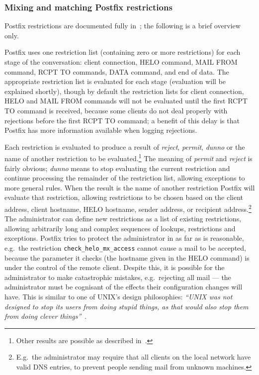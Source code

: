 \subsubsection{Mixing and matching Postfix restrictions}

\label{Mixing and matching Postfix restrictions}

Postfix restrictions are documented fully in~\cite{smtpd_access_readme,
smtpd_per_user_control, policy-servers}; the following is a brief overview
only.

Postfix uses one restriction list (containing zero or more restrictions)
for each stage of the \SMTP{} conversation: client connection, HELO
command, MAIL FROM command, RCPT TO commands, DATA command, and end of
data.  The appropriate restriction list is evaluated for each stage
(evaluation will be explained shortly), though by default the restriction
lists for client connection, HELO and MAIL FROM commands will not be
evaluated until the first RCPT TO command is received, because some clients
do not deal properly with rejections before the first RCPT TO command; a
benefit of this delay is that Postfix has more information available when
logging rejections.

Each restriction is evaluated to produce a result of \textit{reject},
\textit{permit}, \textit{dunno\/} or the name of another restriction to be
evaluated.\footnote{Other results are possible as described
in~\cite{smtpd_access_readme,smtpd_per_user_control,policy-servers}.} The
meaning of \textit{permit\/} and \textit{reject\/} is fairly obvious;
\textit{dunno\/} means to stop evaluating the current restriction and
continue processing the remainder of the restriction list, allowing
exceptions to more general rules.  When the result is the name of another
restriction Postfix will evaluate that restriction, allowing restrictions
to be chosen based on the client \IP{} address, client hostname, HELO
hostname, sender address, or recipient address.\footnote{E.g.\ the
administrator may require that all clients on the local network have valid
DNS entries, to prevent people sending mail from unknown machines.}  The
administrator can define new restrictions as a list of existing
restrictions, allowing arbitrarily long and complex sequences of lookups,
restrictions and exceptions.  Postfix tries to protect the administrator in
as far as is reasonable, e.g.\ the restriction
\texttt{check\_helo\_mx\_access} cannot cause a mail to be accepted,
because the parameter it checks (the hostname given in the HELO command) is
under the control of the remote client.  Despite this, it is possible for
the administrator to make catastrophic mistakes, e.g.\ rejecting all mail
--- the administrator must be cognisant of the effects their configuration
changes will have.  This is similar to one of UNIX's design philosophies:
\textit{``UNIX was not designed to stop its users from doing stupid things,
as that would also stop them from doing clever
things''\/}~\cite{unix-philosophy}.

